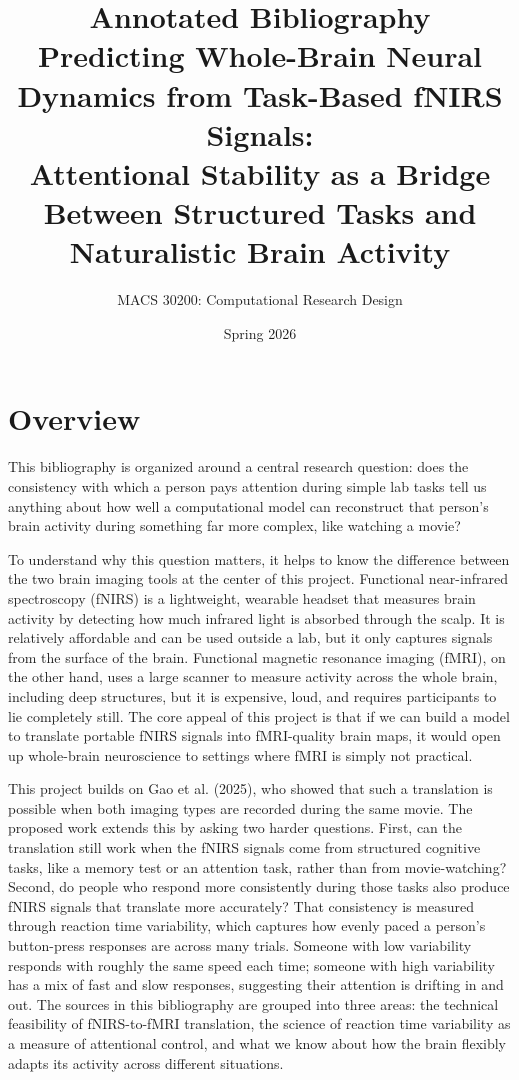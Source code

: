 \documentclass[12pt]{article}
\title{\textbf{Annotated Bibliography} \\
\large Predicting Whole-Brain Neural Dynamics from Task-Based fNIRS Signals: \\
Attentional Stability as a Bridge Between Structured Tasks and Naturalistic Brain Activity}
\author{MACS 30200: Computational Research Design}
\date{Spring 2026}
\begin{document}
\maketitle
\onehalfspacing

\section*{Overview}

This bibliography is organized around a central research question: does the consistency with which a person pays attention during simple lab tasks tell us anything about how well a computational model can reconstruct that person's brain activity during something far more complex, like watching a movie?

To understand why this question matters, it helps to know the difference between the two brain imaging tools at the center of this project. Functional near-infrared spectroscopy (fNIRS) is a lightweight, wearable headset that measures brain activity by detecting how much infrared light is absorbed through the scalp. It is relatively affordable and can be used outside a lab, but it only captures signals from the surface of the brain. Functional magnetic resonance imaging (fMRI), on the other hand, uses a large scanner to measure activity across the whole brain, including deep structures, but it is expensive, loud, and requires participants to lie completely still. The core appeal of this project is that if we can build a model to translate portable fNIRS signals into fMRI-quality brain maps, it would open up whole-brain neuroscience to settings where fMRI is simply not practical.

This project builds on Gao et al. (2025), who showed that such a translation is possible when both imaging types are recorded during the same movie. The proposed work extends this by asking two harder questions. First, can the translation still work when the fNIRS signals come from structured cognitive tasks, like a memory test or an attention task, rather than from movie-watching? Second, do people who respond more consistently during those tasks also produce fNIRS signals that translate more accurately? That consistency is measured through reaction time variability, which captures how evenly paced a person's button-press responses are across many trials. Someone with low variability responds with roughly the same speed each time; someone with high variability has a mix of fast and slow responses, suggesting their attention is drifting in and out. The sources in this bibliography are grouped into three areas: the technical feasibility of fNIRS-to-fMRI translation, the science of reaction time variability as a measure of attentional control, and what we know about how the brain flexibly adapts its activity across different situations.
\end{document}
